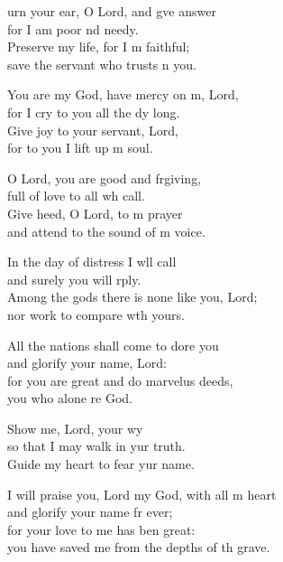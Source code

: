 \settowidth{\versewidth}{I will praise you, Lord my God, with all my heart *}
\begin{psalmverse}%
  \begin{patverse}
urn your ear, O Lord, and g\pointup{\i}ve answer\Med\\
for I am poor nd needy.\\
Preserve my life, for I m faithful;\Med\\
save the servant who trusts \pointup{\i}n you.

You are my God, have mercy on m, Lord,\Med\\
for I cry to you all the dy long.\\
Give joy to your servant,  Lord,\Med\\
for to you I lift up m soul.

O Lord, you are good and frgiving,\Med\\
full of love to all wh call.\\
Give heed, O Lord, to m prayer\Med\\
and attend to the sound of m voice.

In the day of distress I w\pointup{\i}ll call\Med\\
and surely you will rply.\\
Among the gods there is none like you,  Lord;\Med\\
nor work to compare w\pointup{\i}th yours.

All the nations shall come to dore you\Med\\
and glorify your name,  Lord:\\
for you are great and do marvelus deeds,\Med\\
you who alone re God.

Show me, Lord, your wy\Flex\\
so that I may walk in yur truth.\Med\\
Guide my heart to fear yur name.

I will praise you, Lord my God, with all m heart\Med\\
and glorify your name fr ever;\\
for your love to me has ben great:\Med\\
you have saved me from the depths of th grave.


\end{patverse}
\end{psalmverse}
